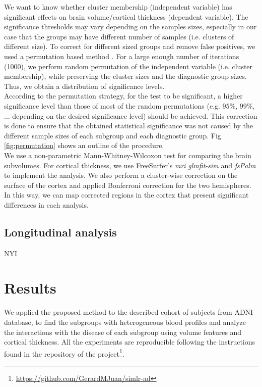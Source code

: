 We want to know whether cluster membership (independent variable) has significant effects on brain volume/cortical thickness (dependent variable). The significance thresholds may vary depending on the samples sizes, especially in our case that the groups may have different number of samples (i.e. clusters of different size). To correct for different sized groups and remove false positives, we used a permutation based method \cite{Good2000}. For a large enough number of iterations (1000), we perform random permutation of the independent variable (i.e. cluster membership), while preserving the cluster sizes and the diagnostic group sizes. Thus, we obtain a distribution of significance levels. \\

According to the permutation strategy, for the test to be significant, a higher significance level than those of most of the random permutations (e.g. $95\%$, $99\%$, ... depending on the desired significance level) should be achieved. This correction is done to ensure that the obtained statistical significance was not caused by the different sample sizes of each subgroup and each diagnostic group. Fig \ref{fig:permutation} shows an outline of the procedure. \\

We use a non-parametric Mann-Whitney-Wilcoxon test for comparing the brain subvolumes. For cortical thickness, we use FreeSurfer's \textit{mri$\_$glmfit-sim} and \textit{fsPalm} to implement the analysis. We also perform a cluster-wise correction on the surface of the cortex and applied Bonferroni correction for the two hemispheres. In this way, we can map corrected regions in the cortex that present significant differences in each analysis. \\

\subsection{Longitudinal analysis}
NYI


\section{Results}

We applied the proposed method to the described cohort of subjects from ADNI database, to find the subgroups with heterogeneous blood profiles and analyze the interactions with the disease of each subgroup using volume features and cortical thickness. All the experiments are reproducible following the instructions found in the repository of the project\footnote{\url{https://github.com/GerardMJuan/simlr-ad}}.

